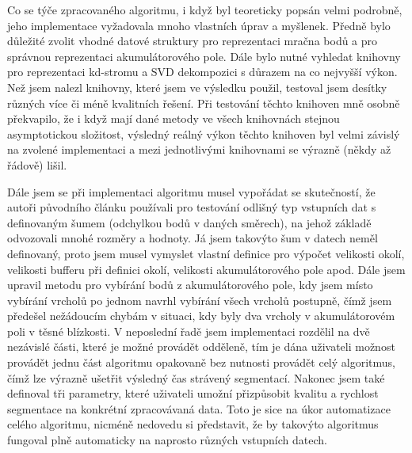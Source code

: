 \documentclass[11pt,twoside,a4paper]{book}
\begin{document}
Co se týče zpracovaného algoritmu, i když byl teoreticky popsán velmi podrobně, jeho implementace vyžadovala mnoho vlastních úprav a myšlenek. Předně bylo důležité zvolit vhodné datové struktury pro reprezentaci mračna bodů a pro správnou reprezentaci akumulátorového pole. Dále bylo nutné vyhledat knihovny pro reprezentaci kd-stromu a SVD dekompozici s důrazem na co nejvyšší výkon. Než jsem nalezl knihovny, které jsem ve výsledku použil, testoval jsem desítky různých více či méně kvalitních řešení. Při testování těchto knihoven mně osobně překvapilo, že i když mají dané metody ve všech knihovnách stejnou asymptotickou složitost, výsledný reálný výkon těchto knihoven byl velmi závislý na zvolené implementaci a mezi jednotlivými knihovnami se výrazně (někdy až řádově) lišil.

Dále jsem se při implementaci algoritmu musel vypořádat se skutečností, že autoři původního článku používali pro testování odlišný typ vstupních dat s definovaným šumem (odchylkou bodů v daných směrech), na jehož základě odvozovali mnohé rozměry a hodnoty. Já jsem takovýto šum v datech neměl definovaný, proto jsem musel vymyslet vlastní definice pro výpočet velikosti okolí, velikosti bufferu při definici okolí, velikosti akumulátorového pole apod. Dále jsem upravil metodu pro vybírání bodů z akumulátorového pole, kdy jsem místo vybírání vrcholů po jednom navrhl vybírání všech vrcholů postupně, čímž jsem předešel nežádoucím chybám v situaci, kdy byly dva vrcholy v akumulátorovém poli v těsné blízkosti. V neposlední řadě jsem implementaci rozdělil na dvě nezávislé části, které je možné provádět odděleně, tím je dána uživateli možnost provádět jednu část algoritmu opakovaně bez nutnosti provádět celý algoritmus, čímž lze výrazně ušetřit výsledný čas strávený segmentací. Nakonec jsem také definoval tři parametry, které uživateli umožní přizpůsobit kvalitu a rychlost segmentace na konkrétní zpracovávaná data. Toto je sice na úkor automatizace celého algoritmu, nicméně nedovedu si představit, že by takovýto algoritmus fungoval plně automaticky na naprosto různých vstupních datech.
\end{document}
